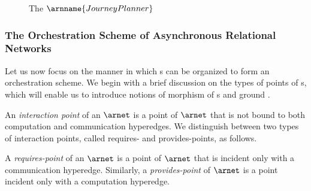 \documentclass{LMCS}
\begin{document}
\begin{exa}
\begin{figure}[h]

      \caption{The  \(\arnname{JourneyPlanner}\)}
      \label{figure:journey-planner-ARN}
    \end{figure}
  \end{exa}


  \subsubsection*{The Orchestration Scheme of Asynchronous Relational Networks}

  Let us now focus on the manner in which s can be organized to form an orchestration scheme.
  We begin with a brief discussion on the types of points of s, which will enable us to introduce notions of morphism of s and ground .

  An \emph{interaction point} of an  \(\arnet\) is a point of \(\arnet\) that is not bound to both computation and communication hyperedges.
  We distinguish between two types of interaction points, called requires- and provides-points, as follows.

  \begin{defi}
    A \emph{requires-point} of an  \(\arnet\) is a point of \(\arnet\) that is incident only with a communication hyperedge.
    Similarly, a \emph{provides-point} of \(\arnet\) is a point incident only with a computation hyperedge.
  \end{defi}
\end{document}

